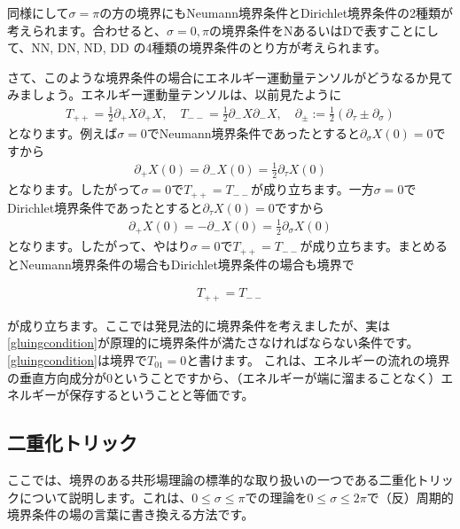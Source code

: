 \documentclass[report,paper=a4, fontsize=12pt, line_length=16cm, number_of_lines=34,dvipdfmx]{jlreq}
\newenvironment{important}{\begin{tcolorbox}[
  colback = white,
  colframe = red!35,
  boxrule = 2mm,
  fonttitle = \bfseries,
  after = \noindent] }{\end{tcolorbox}}
\numberwithin{equation}{chapter}
\numberwithin{equation}{section}
\newcommand{\del}{\partial}
\begin{document}
同様にして$\sigma=\pi$の方の境界にもNeumann境界条件とDirichlet境界条件の2種類が考えられます。合わせると、$\sigma=0,\pi$の境界条件をNあるいはDで表すことにして、NN, DN, ND, DD の4種類の境界条件のとり方が考えられます。

さて、このような境界条件の場合にエネルギー運動量テンソルがどうなるか見てみましょう。エネルギー運動量テンソルは、以前見たように
\begin{align}
  T_{++}=\frac12 \del_{+}X\del_{+}X,\quad
  T_{--}=\frac12 \del_{-}X\del_{-}X,\quad
  \del_{\pm}:=\frac12 (\del_{\tau}\pm \del_{\sigma})
\end{align}
となります。例えば$\sigma=0$でNeumann境界条件であったとすると$\del_{\sigma}X(0)=0$ですから
\begin{align}
  \del_{+}X(0)=\del_{-}X(0)=\frac12 \del_{\tau}X(0)
\end{align}
となります。したがって$\sigma=0$で$T_{++}=T_{--}$が成り立ちます。一方$\sigma=0$でDirichlet境界条件であったとすると$\del_{\tau}X(0)=0$ですから
\begin{align}
  \del_{+}X(0)=-\del_{-}X(0)=\frac12 \del_{\sigma}X(0)
\end{align}
となります。したがって、やはり$\sigma=0$で$T_{++}=T_{--}$が成り立ちます。まとめるとNeumann境界条件の場合もDirichlet境界条件の場合も境界で
\begin{important}
  \begin{align}
    T_{++}=T_{--}\label{gluingcondition}
  \end{align}
\end{important}
が成り立ちます。ここでは発見法的に境界条件を考えましたが、実は\eqref{gluingcondition}が原理的に境界条件が満たさなければならない条件です。
\eqref{gluingcondition}は境界で$T_{01}=0$と書けます。
これは、エネルギーの流れの境界の垂直方向成分が$0$ということですから、（エネルギーが端に溜まることなく）エネルギーが保存するということと等価です。

\subsection{二重化トリック}
ここでは、境界のある共形場理論の標準的な取り扱いの一つである二重化トリックについて説明します。これは、$0\le \sigma \le \pi$での理論を$0\le \sigma \le 2\pi$で（反）周期的境界条件の場の言葉に書き換える方法です。
\end{document}
